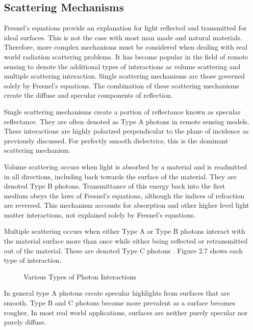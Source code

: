 \subsection{Scattering Mechanisms}

Fresnel’s equations provide an explanation for light reflected and transmitted for ideal surfaces.  This is not the case with most man made and natural materials.  Therefore, more complex mechanisms must be considered when dealing with real world radiation scattering problems.  It has become popular in the field of remote sensing to denote the additional types of interactions as volume scattering and multiple scattering
 interaction.  Single scattering mechanisms are those governed solely by Fresnel’s equations.  The combination of these scattering mechanisms create the diffuse and specular components of reflection.

Single scattering mechanisms create a portion of reflectance known as specular reflectance.  They are often denoted as Type A photons in remote sensing models.  These interactions are highly polarized perpendicular to the plane of incidence as previously discussed. For perfectly smooth dielectrics, this is the dominant scattering mechanism.

Volume scattering occurs when light is absorbed by a material and is readmitted in all directions, including back towards the surface of the material.  They are denoted Type B photons.  Transmittance of this energy back into the first medium obeys the laws of Fresnel’s equations, although the indices of refraction are reversed.  This mechanism accounts for absorption and other higher level light matter interactions, not explained solely by Fresnel’s equations.

Multiple scattering occurs when either Type A or Type B photons interact with the material surface more than once while either being reflected or retransmitted out of the material.  These are denoted Type C photons \cite{schott}.  Figure 2.7 shows each type of interaction.
%
\begin{figure}
    \begin{center}
    \end{center}
    \caption{Various Types of Photon Interactions}
    \label{fig:scattering}
\end{figure}
%
In general type A photons create specular highlights from surfaces that are smooth.  Type B and C photons become more prevalent as a surface becomes rougher.  In most real world applications, surfaces are neither purely specular nor purely diffuse.

